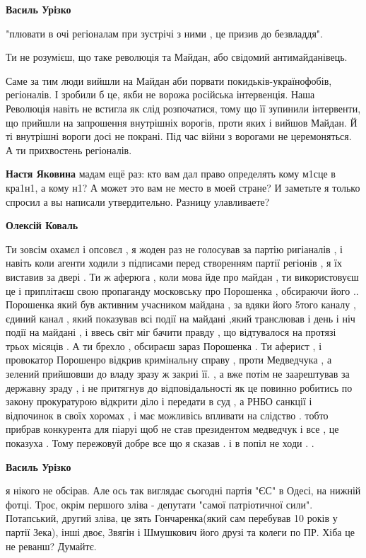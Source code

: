 \begin{itemize}
\begin{itemize}
\textbf{Василь Урізко} 

"плювати в очі регіоналам при зустрічі з ними , це призив до безвладдя".

Ти не розумієш, що таке революція та Майдан, або свідомий антимайданівець.

Саме за тим люди вийшли на Майдан аби порвати покидьків-українофобів,
регіоналів. І зробили б це, якби не ворожа російська інтервенція. Наша
Революція навіть не встигла як слід розпочатися, тому що її зупинили
інтервенти, що прийшли на запрошення внутрішніх ворогів, проти яких і вийшов
Майдан. Й ті внутрішні вороги досі не покрані. Під час війни з ворогами не
церемоняться. А ти прихвостень регіоналів.

\textbf{Настя Яковина} мадам ещё раз: кто вам дал право определять кому м1сце в кра1н1, а кому н1? А может это вам не место в моей стране? И заметьте я только спросил а вы написали утвердительно. Разницу улавливаете?

\textbf{Олексій Коваль} 

Ти зовсім охамєл і опсовєл , я жоден раз не голосував за партію ригіаналів , і
навіть коли агенти ходили з підписами перед створенням партії регіонів , я їх
виставив за двері . Ти ж аферюга , коли мова йде про майдан , ти використовуєш
це і приплітаєш свою пропаганду московську про Порошенка , обсираючи його ..
Порошенка який був активним учасником майдана , за вдяки його 5того каналу ,
єдиний канал , який показував всі події на майдані ,який транслював і день і
ніч події на майдані , і ввесь світ міг бачити правду , що відтувалося на
протязі трьох місяців . А ти брехло , обсираєш зараз Порошенка . Ти аферист , і
провокатор Порошенро відкрив кримінальну справу , проти Медведчука , а зелений
прийшовши до владу зразу ж закриі її. , а вже потім не заарештував за державну
зраду , і не притягнув до відповідальності як це повинно робитись по закону
прокуратурою відкрити діло і передати в суд , а РНБО санкції і відпочинок в
своїх хоромах , і має можливісь впливати на слідство . тобто прибрав конкурента
для піаруі щоб не став президентом медведчук і все , це показуха . Тому
пережовуй добре все що я сказав . і в попіл не ходи . .

\textbf{Василь Урізко} 

я нікого не обсірав. Але ось так виглядає сьогодні партія "ЄС" в Одесі, на
нижній фотці. Троє, окрім першого зліва - депутати "самої патріотичної сили".
Потапський, другий зліва, це зять Гончаренка(який сам перебував 10 років у
партії Зека), інші двоє, Звягін і Шмушкович його друзі та колеги по ПР. Хіба це
не реванш? Думайтє.


\end{itemize}
\end{itemize}
